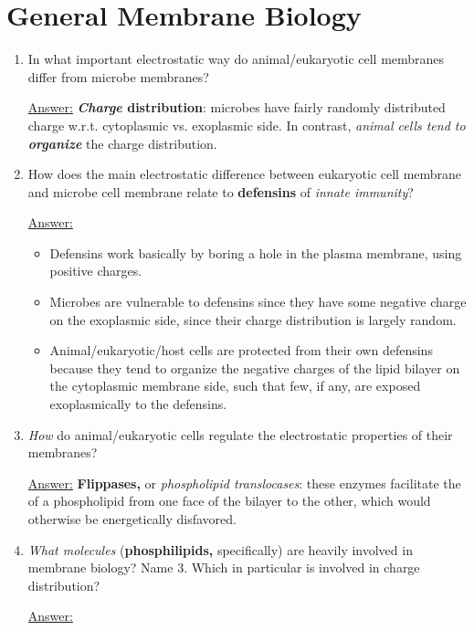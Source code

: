 \documentclass{article}
\newenvironment{QandA}{\begin{enumerate}[label=\bfseries Q\arabic*.]}
                       {\end{enumerate}}
\newenvironment{answered}{\par\normalfont\underline{Answer:}}{}
\begin{document}
\section{General Membrane Biology}
\begin{QandA}
  \item{In what important electrostatic way do animal/eukaryotic cell membranes differ from microbe membranes?}
    \begin{answered}
    \textbf{\textit{Charge} distribution}: microbes have fairly randomly distributed charge w.r.t. cytoplasmic vs. exoplasmic side. In contrast, \textit{animal cells tend to \textbf{organize}} the charge distribution.
    \end{answered}
  \item{How does the main electrostatic difference between eukaryotic cell membrane and microbe cell membrane relate to \textbf{defensins} of \textit{innate immunity}?}
    \begin{answered}
    \begin{itemize}
      \item{Defensins work basically by boring a hole in the plasma membrane, using positive charges.}
      \item{Microbes are vulnerable to defensins since they have some negative charge on the exoplasmic side, since their charge distribution is largely random.}
      \item{Animal/eukaryotic/host cells are protected from their own defensins because they tend to organize the negative charges of the lipid bilayer on the cytoplasmic membrane side, such that few, if any, are exposed exoplasmically to the defensins.}
    \end{itemize}
    \end{answered}
  \item{\textit{How} do animal/eukaryotic cells regulate the electrostatic properties of their membranes?}
    \begin{answered}
    \textbf{Flippases,} or \textit{phospholipid translocases}: these enzymes facilitate the  of a phospholipid from one face of the bilayer to the other, which would otherwise be energetically disfavored.
    \end{answered}
  \item{\textit{What molecules} (\textbf{phosphilipids,} specifically) are heavily involved in membrane biology? Name 3. Which in particular is involved in charge distribution?}
    \begin{answered}
    \begin{itemize}

\end{itemize}
\end{answered}
\end{QandA}
\end{document}
